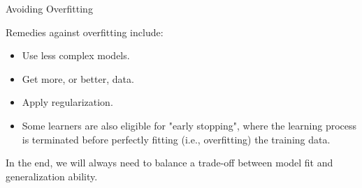 \begin{vbframe}{Avoiding Overfitting}

Remedies against overfitting include:
\begin{itemize}
  \item Use less complex models. 
  \item Get more, or better, data.
  \item Apply regularization.
  \item Some learners are also eligible for "early stopping", where the 
  learning process is terminated before perfectly fitting (i.e., overfitting) 
  the training data.
\end{itemize}

\lz

In the end, we will always need to balance a trade-off between model fit 
and generalization ability.

\end{vbframe}





